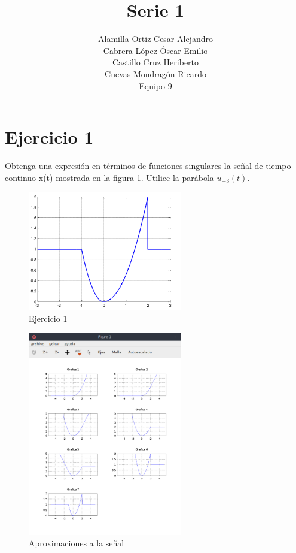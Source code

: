 \documentclass[10pt,a4paper]{report}
\author{Alamilla Ortiz Cesar Alejandro\\Cabrera López Óscar Emilio\\Castillo Cruz Heriberto\\Cuevas Mondragón Ricardo\\Equipo 9}
\title{Serie 1}
\begin{document}
\thispagestyle{fancy}
\maketitle
\tableofcontents
\newpage
\setcounter{chapter}{1}

\section[Ejercicio 1]{Ejercicio 1}

Obtenga una expresión en términos de funciones singulares la señal de tiempo continuo x(t) mostrada en la figura 1. Utilice la parábola $u_{-3}(t)$.\\

\begin{figure}[H]
  \begin{center}
    \includegraphics[width=0.6\textwidth]{SignalEjemplo}
    \caption{Ejercicio 1}
    \label{fig:Ejercicio 1}
  \end{center}
\end{figure}



\begin{figure}[H]
\centering
\includegraphics[width=0.6\textwidth]{SignalGraphic}
\caption{Aproximaciones a la señal}
\label{fig:SignalGraphic}
\end{figure}
\end{document}
